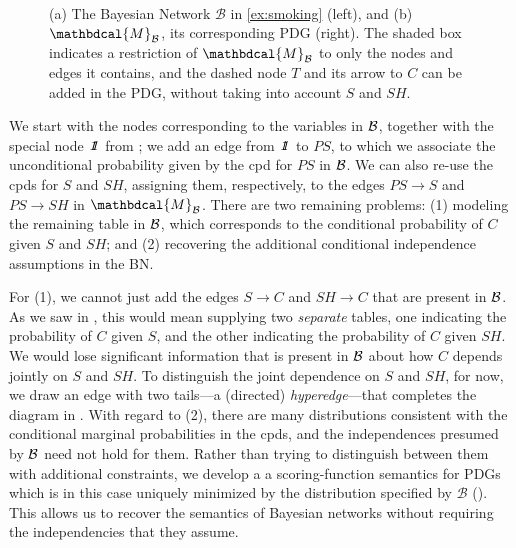 \documentclass[letterpaper]{article} %
\newcommand\cmergearr[4]{
		\draw[arr,-] (#1) -- (#4) -- (#2);
		\draw[arr, shorten <=0] (#4) -- (#3);
	}
\newcommand\mergearr[3]{
		\coordinate (center-#1#2#3) at (barycentric cs:#1=1,#2=1,#3=1.2);
		\cmergearr{#1}{#2}{#3}{center-#1#2#3}
	}
\theoremstyle{plain}
\theoremstyle{definition}
\theoremstyle{remark}
\newcounter{subfigure}
\newcommand{\dg}[1]{\mathbdcal{#1}}
\newcommand{\pdgunit}{\mathrlap{\mathit 1} \mspace{2.3mu}\mathit 1}
\newcommand{\PDGof}[1]{{\dg M}_{#1}}
\begin{document}
\begin{example}[emulating a BN]
\begin{figure}[ht!]
\fi
	\hfill~
	\label{subfig:smoking-pdg}
\addtocounter{figure}{-1}
\caption{ (a) The Bayesian Network $\mathcal B$ in \cref{ex:smoking} (left), and
(b) $\PDGof{\mathcal B}$, its corresponding PDG (right). The shaded box
indicates a restriction of $\PDGof{\mathcal B}$ to only the nodes and edges it
contains, and the dashed node $T$ and its arrow to $C$ can be added in the PDG,
without taking into account $S$ and $SH$.}
\label{fig:smoking-bn+pdg}
\end{figure}

We start with the nodes corresponding to the variables in $\cal B$, together
with the special node $\pdgunit$ from ; we add an edge
from ${\pdgunit}$ to $\mathit{PS}$, to which we associate the unconditional
probability given by the cpd for $\mathit{PS}$ in $\cal B$. We can also re-use
the cpds for $S$ and $\mathit{SH}$, assigning them, respectively, to the edges
$PS \to S$ and $PS \to SH$ in $\PDGof{{\mathcal B}}$.
There are two remaining problems: (1) modeling the remaining table in $\cal B$,
which corresponds to the conditional probability of $C$ given $S$ and $SH$; and
(2) recovering the additional
conditional
independence assumptions in the BN. 

For (1), we cannot just add the edges $S \to C$ and $SH \to C$ that are present
in $\cal B$. As we saw in , this would mean
supplying two \emph{separate} tables, one indicating the probability of $C$
given $S$, and the other indicating the probability of $C$ given
$\mathit{SH}$.  We would lose significant information that is
present in $\cal B$  about 
how $C$ depends jointly on $S$ and $SH$. To distinguish the joint dependence on
$S$ and $\mathit{SH}$, for now, we draw an edge with two tails---a
(directed)
\emph{hyperedge}---that completes the diagram in . 
With regard to (2), there are many distributions consistent with the conditional
marginal probabilities in the cpds, and the independences presumed by $\cal B$
need not hold for them. 
Rather than trying to distinguish between them with additional constraints,
we develop a a scoring-function semantics for PDGs
which 
is in this case uniquely minimized by the distribution 
specified by ${\mathcal B}$ ().
This allows us to recover the semantics of Bayesian networks without requiring the independencies that they assume.


\end{example}
\end{document}
